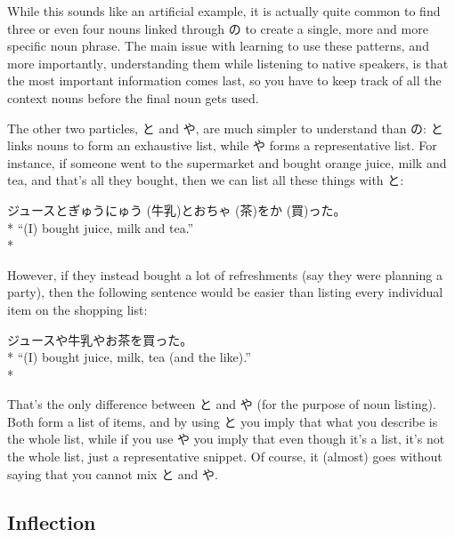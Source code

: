 \documentclass[11pt, b5paper, twoside, openright, onecolumn]{book}
\makeatletter
\newcommand*{\rubystack}[2]{{\relscale{0.5}%
  \begin{tabular}[b]{@{}c@{}}%
    {#1}\\%
   {\textscale{2}{#2}}%
  \end{tabular}}%
}
\DeclareRobustCommand*{\ruby}[2]{%
  \mbox{%
    \setlength{\parskip}{0ex}%
    \BeginAccSupp{method=pdfstringdef,ActualText={#1}}%
      \rubystack{\phantom{#2}}{#1}%
      \llap{%
        \rubystack{#2}{\phantom{#1}}%
      }%
    \EndAccSupp{}%
  }%
}
\renewcommand*{\ruby}[2]{#2 (#1)}%
\newenvironment{exampleblock}{
\setlength{\parindent}{0.6in}
\begin{minipage}[t]{\dimexpr\textwidth-\parindent}}
{\end{minipage}}
\makeatother
\begin{document}
While this sounds like an artificial example‚ it is actually quite common to find three or even four nouns linked through の to create a single‚ more and more specific noun phrase. The main issue with learning to use these patterns‚ and more importantly‚ understanding them while listening to native speakers‚ is that the most important information comes last‚ so you have to keep track of all the context nouns before the final  noun gets used.

The other two particles‚ と and や‚ are much simpler to understand than の: と links nouns to form an exhaustive list‚ while や forms a representative list. For instance‚ if someone went to the supermarket and bought orange juice‚ milk and tea‚ and that’s all they bought‚ then we can list all these things with と:

\vspace{0.4cm}
\begin{exampleblock}
ジュースと\ruby{牛乳}{ぎゅうにゅう}とお\ruby{茶}{ちゃ}を\ruby{買}{か}った。 \\* 
“(I) bought juice‚ milk and tea.” \\* 
\end{exampleblock}
\vspace{0.2cm}

However‚ if they instead bought a lot of refreshments (say they were planning a party)‚ then the following sentence would be easier than listing every individual item on the shopping list:

\vspace{0.4cm}
\begin{exampleblock}
ジュースや牛乳やお茶を買った。 \\* 
“(I) bought juice‚ milk‚ tea (and the like).” \\* 
\end{exampleblock}
\vspace{0.2cm}

That’s the only difference between と and や (for the purpose of noun listing). Both form a list of items‚ and by using と you imply that what you describe is the whole list‚ while if you use や you imply that even though it’s a list‚ it’s not the whole list‚ just a representative snippet. Of course‚ it (almost) goes without saying that you cannot mix と and や.

\subsection{Inflection}
\end{document}

